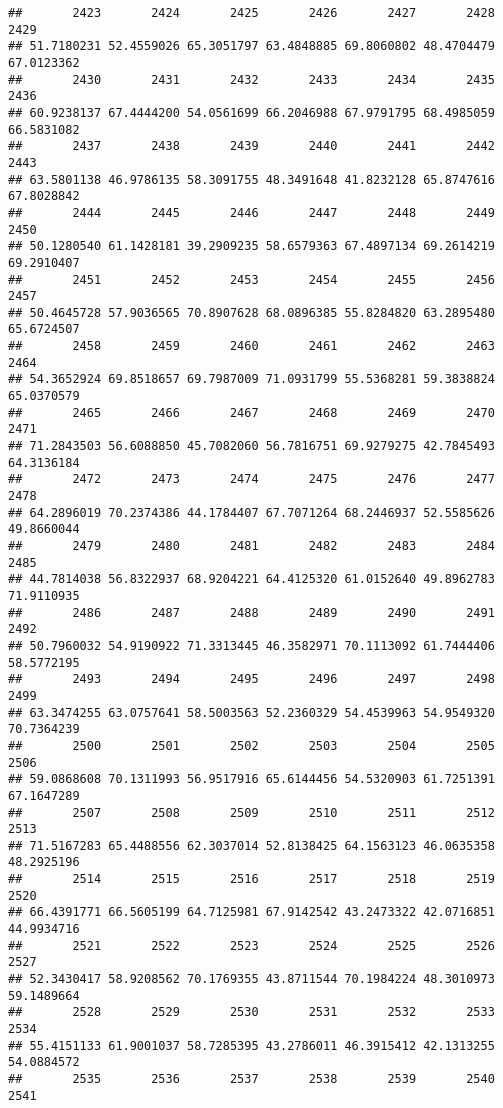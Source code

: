 \documentclass[
]{article}
\begin{document}
\begin{verbatim}
##       2423       2424       2425       2426       2427       2428       2429 
## 51.7180231 52.4559026 65.3051797 63.4848885 69.8060802 48.4704479 67.0123362 
##       2430       2431       2432       2433       2434       2435       2436 
## 60.9238137 67.4444200 54.0561699 66.2046988 67.9791795 68.4985059 66.5831082 
##       2437       2438       2439       2440       2441       2442       2443 
## 63.5801138 46.9786135 58.3091755 48.3491648 41.8232128 65.8747616 67.8028842 
##       2444       2445       2446       2447       2448       2449       2450 
## 50.1280540 61.1428181 39.2909235 58.6579363 67.4897134 69.2614219 69.2910407 
##       2451       2452       2453       2454       2455       2456       2457 
## 50.4645728 57.9036565 70.8907628 68.0896385 55.8284820 63.2895480 65.6724507 
##       2458       2459       2460       2461       2462       2463       2464 
## 54.3652924 69.8518657 69.7987009 71.0931799 55.5368281 59.3838824 65.0370579 
##       2465       2466       2467       2468       2469       2470       2471 
## 71.2843503 56.6088850 45.7082060 56.7816751 69.9279275 42.7845493 64.3136184 
##       2472       2473       2474       2475       2476       2477       2478 
## 64.2896019 70.2374386 44.1784407 67.7071264 68.2446937 52.5585626 49.8660044 
##       2479       2480       2481       2482       2483       2484       2485 
## 44.7814038 56.8322937 68.9204221 64.4125320 61.0152640 49.8962783 71.9110935 
##       2486       2487       2488       2489       2490       2491       2492 
## 50.7960032 54.9190922 71.3313445 46.3582971 70.1113092 61.7444406 58.5772195 
##       2493       2494       2495       2496       2497       2498       2499 
## 63.3474255 63.0757641 58.5003563 52.2360329 54.4539963 54.9549320 70.7364239 
##       2500       2501       2502       2503       2504       2505       2506 
## 59.0868608 70.1311993 56.9517916 65.6144456 54.5320903 61.7251391 67.1647289 
##       2507       2508       2509       2510       2511       2512       2513 
## 71.5167283 65.4488556 62.3037014 52.8138425 64.1563123 46.0635358 48.2925196 
##       2514       2515       2516       2517       2518       2519       2520 
## 66.4391771 66.5605199 64.7125981 67.9142542 43.2473322 42.0716851 44.9934716 
##       2521       2522       2523       2524       2525       2526       2527 
## 52.3430417 58.9208562 70.1769355 43.8711544 70.1984224 48.3010973 59.1489664 
##       2528       2529       2530       2531       2532       2533       2534 
## 55.4151133 61.9001037 58.7285395 43.2786011 46.3915412 42.1313255 54.0884572 
##       2535       2536       2537       2538       2539       2540       2541 

\end{verbatim}
\end{document}
